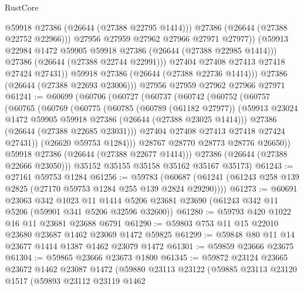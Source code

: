 \begin{lexlean}{RustCore}
\begin{coremodule}
                      @59918
                      @27386
                      (@26644 (@27388 @22795 @1414)))
                    @27386
                    (@26644 (@27388 @22752 @22966)))
                  @27956
                  @27959
                  @27962
                  @27966
                  @27971
                  @27977))
              (@59913 @22984 @1472 @59905 @59918 @27386 (@26644 (@27388 @22985 @1414)))
              @27386
              (@26644 (@27388 @22744 @22991)))
            @27404
            @27408
            @27413
            @27418
            @27424
            @27431))
        @59918
        @27386
        (@26644 (@27388 @22736 @1414)))
      @27386
      (@26644 (@27388 @22693 @23006)))
    @27956
    @27959
    @27962
    @27966
    @27971
@61241 := @60699
    (@60706
      (@60727
        (@60737
          (@60742
            (@60752
              (@60757
                (@60765
                  (@60769
                    (@60775
                      (@60785
                        (@60789 (@61182 @27977))
                        (@59913 @23024 @1472 @59905 @59918 @27386 (@26644 (@27388 @23025 @1414)))
                        @27386
                        (@26644 (@27388 @22685 @23031)))
                      @27404
                      @27408
                      @27413
                      @27418
                      @27424
                      @27431))
                  (@26620 @59753 @1284)))
              @28767
              @28770
              @28773
              @28776
              @26650))
          @59918
          @27386
          (@26644 (@27388 @22677 @1414)))
        @27386
        (@26644 (@27388 @22666 @23050)))
      @35152
      @35155
      @35158
      @35162
      @35167
      @35173)
@61243 := @27161 @59753 @1284
@61256 := @59783
    (@60687 (@61241 (@61243 @258 @139 @2825 (@27170 @59753 @1284 @255 @139 @2824 @29290))))
@61273 := @60691
    @23063
    @342
    @1023
    @11
    @1414
    @5206
    @23681
    @23690
    (@61243 @342 @11 @5206 (@59901 @341 @5206 @32596 @32600))
@61280 := @59793 @420 @1022 @16 @11 @23681 @23688 @6791
@61290 := @59803 @753 @11 @15 @22010 @23680 @23687 @1462 @23069 @1472 @59825
@61299 := @59848 @80 @11 @14 @23677 @1414 @1387 @1462 @23079 @1472
@61301 := @59859 @23666 @23675
@61304 := @59865 @23666 @23673 @1800
@61345 := @59872
    @23124
    @23665
    @23672
    @1462
    @23087
    @1472
    (@59880
      @23113
      @23122
      (@59885
        @23113
        @23120
        @1517
        (@59893
          @23112
          @23119
          @1462

\end{coremodule}
\end{lexlean}
